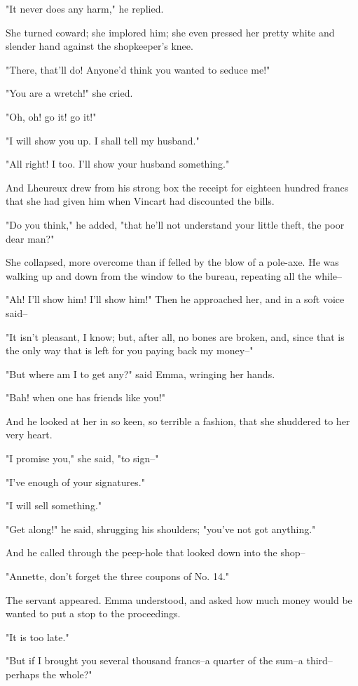 \documentclass{tufte-book}
\begin{document}
"It never does any harm," he replied.

She turned coward; she implored him; she even pressed her pretty white
and slender hand against the shopkeeper's knee.

"There, that'll do! Anyone'd think you wanted to seduce me!"

"You are a wretch!" she cried.

"Oh, oh! go it! go it!"

"I will show you up. I shall tell my husband."

"All right! I too. I'll show your husband something."

And Lheureux drew from his strong box the receipt for eighteen hundred
francs that she had given him when Vincart had discounted the bills.

"Do you think," he added, "that he'll not understand your little theft,
the poor dear man?"

She collapsed, more overcome than if felled by the blow of a pole-axe.
He was walking up and down from the window to the bureau, repeating all
the while--

"Ah! I'll show him! I'll show him!" Then he approached her, and in a
soft voice said--

"It isn't pleasant, I know; but, after all, no bones are broken, and,
since that is the only way that is left for you paying back my money--"

"But where am I to get any?" said Emma, wringing her hands.

"Bah! when one has friends like you!"

And he looked at her in so keen, so terrible a fashion, that she
shuddered to her very heart.

"I promise you," she said, "to sign--"

"I've enough of your signatures."

"I will sell something."

"Get along!" he said, shrugging his shoulders; "you've not got
anything."

And he called through the peep-hole that looked down into the shop--

"Annette, don't forget the three coupons of No. 14."

The servant appeared. Emma understood, and asked how much money would be
wanted to put a stop to the proceedings.

"It is too late."

"But if I brought you several thousand francs--a quarter of the sum--a
third--perhaps the whole?"
\end{document}
